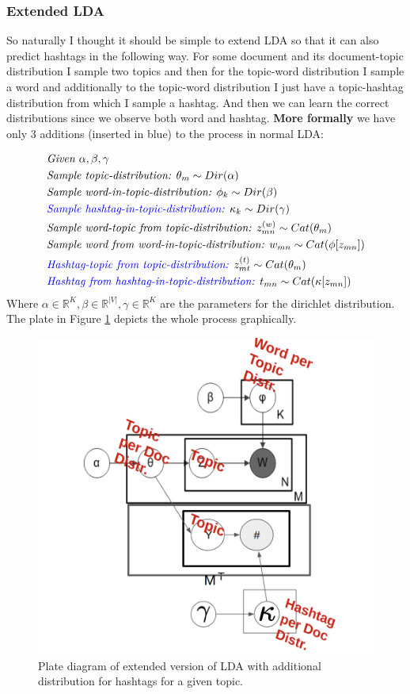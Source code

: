 \documentclass[10pt,conference,compsocconf]{IEEEtran}
\newcommand\R{\mathbb{R}}
\begin{document}
\subsubsection{Extended LDA}
So naturally I thought it should be simple to extend LDA so that it can also predict hashtags in the following way. For some document and its document-topic distribution I sample two topics and then for the topic-word distribution I sample a word and additionally to the topic-word distribution I just have a topic-hashtag distribution from which I sample a hashtag. And then we can learn the correct distributions since we observe both word and hashtag. \textbf{More formally} we have only 3 additions (inserted in blue) to the process in normal LDA: 

\small
\begin{align*}
&\textit{Given } \alpha, \beta, \gamma \\
&\textit{Sample topic-distribution: } \theta_m \sim Dir(\alpha)\\
&\textit{Sample word-in-topic-distribution: } \phi_k \sim Dir(\beta) \\
& \textcolor{blue}{\textit{Sample hashtag-in-topic-distribution: }} \kappa_k \sim Dir(\gamma) \\
&\textit{Sample word-topic from topic-distribution: } z^{(w)}_{mn} \sim Cat(\theta_m) \\
&\textit{Sample word from word-in-topic-distribution: } w_{mn} \sim Cat(\phi[z_{mn}])\\
&\textcolor{blue}{\textit{Hashtag-topic from topic-distribution: }} z^{(t)}_{mt} \sim Cat(\theta_m) \\
&\textcolor{blue}{\textit{Hashtag from hashtag-in-topic-distribution: }} t_{mn} \sim Cat(\kappa[z_{mn}])\\
\end{align*}
\normalsize
Where $\alpha \in \R^K, \beta \in \R^{|V|}, \gamma \in \R^K$ are the parameters for the dirichlet distribution. The plate in Figure \ref{fig:ldaplate2} depicts the whole process graphically.
\begin{figure}
	\centering
	\includegraphics[width=0.7\linewidth]{images/extended_lda}
	\caption{Plate diagram of extended version of LDA with additional distribution for hashtags for a given topic. }
	\label{fig:ldaplate2}
\end{figure}
\end{document}
